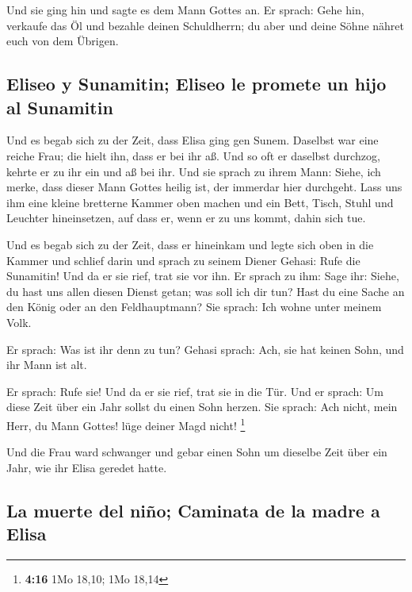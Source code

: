  Und sie ging hin und sagte es dem Mann Gottes an. Er
sprach: Gehe hin, verkaufe das Öl und bezahle deinen Schuldherrn; du
aber und deine Söhne nähret euch von dem Übrigen.

\hypertarget{eliseo-y-sunamitin-eliseo-le-promete-un-hijo-al-sunamitin}{%
\subsection{Eliseo y Sunamitin; Eliseo le promete un hijo al
Sunamitin}\label{eliseo-y-sunamitin-eliseo-le-promete-un-hijo-al-sunamitin}}

 Und es begab sich zu der Zeit, dass Elisa ging gen Sunem.
Daselbst war eine reiche Frau; die hielt ihn, dass er bei ihr aß. Und so
oft er daselbst durchzog, kehrte er zu ihr ein und aß bei ihr.
 Und sie sprach zu ihrem Mann: Siehe, ich merke, dass
dieser Mann Gottes heilig ist, der immerdar hier durchgeht.
 Lass uns ihm eine kleine bretterne Kammer oben machen
und ein Bett, Tisch, Stuhl und Leuchter hineinsetzen, auf dass er, wenn
er zu uns kommt, dahin sich tue.

 Und es begab sich zu der Zeit, dass er hineinkam und
legte sich oben in die Kammer und schlief darin  und
sprach zu seinem Diener Gehasi: Rufe die Sunamitin! Und da er sie rief,
trat sie vor ihn.  Er sprach zu ihm: Sage ihr: Siehe, du
hast uns allen diesen Dienst getan; was soll ich dir tun? Hast du eine
Sache an den König oder an den Feldhauptmann? Sie sprach: Ich wohne
unter meinem Volk.

 Er sprach: Was ist ihr denn zu tun? Gehasi sprach: Ach,
sie hat keinen Sohn, und ihr Mann ist alt.

 Er sprach: Rufe sie! Und da er sie rief, trat sie in die
Tür.  Und er sprach: Um diese Zeit über ein Jahr sollst
du einen Sohn herzen. Sie sprach: Ach nicht, mein Herr, du Mann Gottes!
lüge deiner Magd nicht! \footnote{\textbf{4:16} 1Mo 18,10; 1Mo 18,14}

 Und die Frau ward schwanger und gebar einen Sohn um
dieselbe Zeit über ein Jahr, wie ihr Elisa geredet hatte.

\hypertarget{la-muerte-del-niuxf1o-caminata-de-la-madre-a-elisa}{%
\subsection{La muerte del niño; Caminata de la madre a
Elisa}\label{la-muerte-del-niuxf1o-caminata-de-la-madre-a-elisa}}

